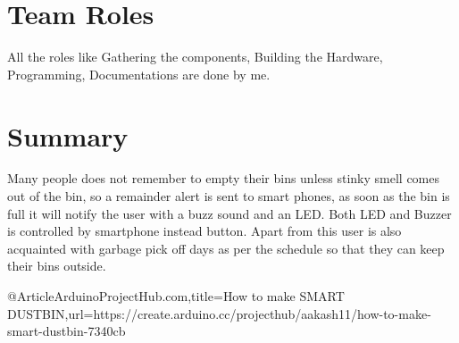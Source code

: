 \documentclass[11pt]{extarticle}
\begin{document}
\section*{Team Roles}
  All the roles like Gathering the components, Building the Hardware, Programming, Documentations are done by me.
  
 \section*{Summary}
 Many people does not remember to empty their bins unless stinky smell comes out of the bin, so a remainder alert is sent to smart phones, as soon as the bin is full it will notify the user with a buzz sound and an LED. Both LED and Buzzer is controlled by smartphone instead button. Apart from this user is also acquainted with garbage pick off days as per the schedule so that they can keep their bins outside.
 
 
 \begin{thebibliography}{1}

\bibitem @Article{ArduinoProjectHub.com,title={How to make SMART DUSTBIN},url={https://create.arduino.cc/projecthub/aakash11/how-to-make-smart-dustbin-7340cb}
 }



\end{thebibliography}
\end{document}
